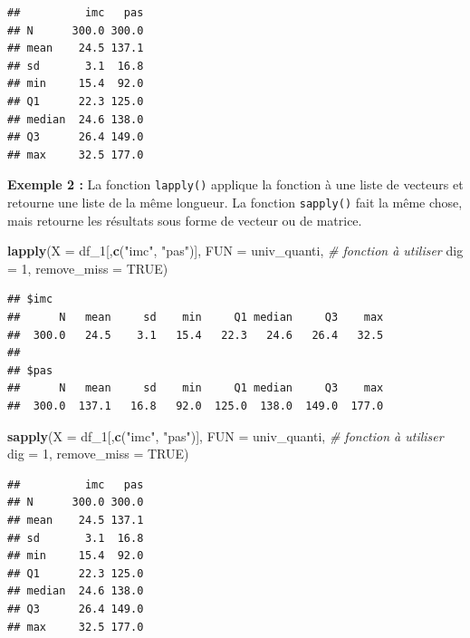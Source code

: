 \documentclass[
]{book}
\newenvironment{Shaded}{\begin{snugshade}}{\end{snugshade}}
\newcommand{\AttributeTok}[1]{\textcolor[rgb]{0.13,0.29,0.53}{#1}}
\newcommand{\CommentTok}[1]{\textcolor[rgb]{0.56,0.35,0.01}{\textit{#1}}}
\newcommand{\ConstantTok}[1]{\textcolor[rgb]{0.56,0.35,0.01}{#1}}
\newcommand{\DecValTok}[1]{\textcolor[rgb]{0.00,0.00,0.81}{#1}}
\newcommand{\FunctionTok}[1]{\textcolor[rgb]{0.13,0.29,0.53}{\textbf{#1}}}
\newcommand{\NormalTok}[1]{#1}
\newcommand{\StringTok}[1]{\textcolor[rgb]{0.31,0.60,0.02}{#1}}
\begin{document}
\begin{verbatim}
##          imc   pas
## N      300.0 300.0
## mean    24.5 137.1
## sd       3.1  16.8
## min     15.4  92.0
## Q1      22.3 125.0
## median  24.6 138.0
## Q3      26.4 149.0
## max     32.5 177.0
\end{verbatim}

\textbf{Exemple 2 :} La fonction \texttt{lapply()} applique la fonction à une liste de vecteurs et retourne une liste de la même longueur. La fonction \texttt{sapply()} fait la même chose, mais retourne les résultats sous forme de vecteur ou de matrice.

\begin{Shaded}
\begin{Highlighting}[]
\FunctionTok{lapply}\NormalTok{(}\AttributeTok{X =}\NormalTok{ df\_1[,}\FunctionTok{c}\NormalTok{(}\StringTok{"imc"}\NormalTok{, }\StringTok{"pas"}\NormalTok{)], }
      \AttributeTok{FUN =}\NormalTok{ univ\_quanti,  }\CommentTok{\# fonction à utiliser}
      \AttributeTok{dig =} \DecValTok{1}\NormalTok{,}
      \AttributeTok{remove\_miss =} \ConstantTok{TRUE}\NormalTok{)}
\end{Highlighting}
\end{Shaded}

\begin{verbatim}
## $imc
##      N   mean     sd    min     Q1 median     Q3    max 
##  300.0   24.5    3.1   15.4   22.3   24.6   26.4   32.5 
## 
## $pas
##      N   mean     sd    min     Q1 median     Q3    max 
##  300.0  137.1   16.8   92.0  125.0  138.0  149.0  177.0
\end{verbatim}

\begin{Shaded}
\begin{Highlighting}[]
\FunctionTok{sapply}\NormalTok{(}\AttributeTok{X =}\NormalTok{ df\_1[,}\FunctionTok{c}\NormalTok{(}\StringTok{"imc"}\NormalTok{, }\StringTok{"pas"}\NormalTok{)],  }
       \AttributeTok{FUN =}\NormalTok{ univ\_quanti,  }\CommentTok{\# fonction à utiliser}
       \AttributeTok{dig =} \DecValTok{1}\NormalTok{,}
       \AttributeTok{remove\_miss =} \ConstantTok{TRUE}\NormalTok{) }
\end{Highlighting}
\end{Shaded}

\begin{verbatim}
##          imc   pas
## N      300.0 300.0
## mean    24.5 137.1
## sd       3.1  16.8
## min     15.4  92.0
## Q1      22.3 125.0
## median  24.6 138.0
## Q3      26.4 149.0
## max     32.5 177.0
\end{verbatim}
\end{document}
